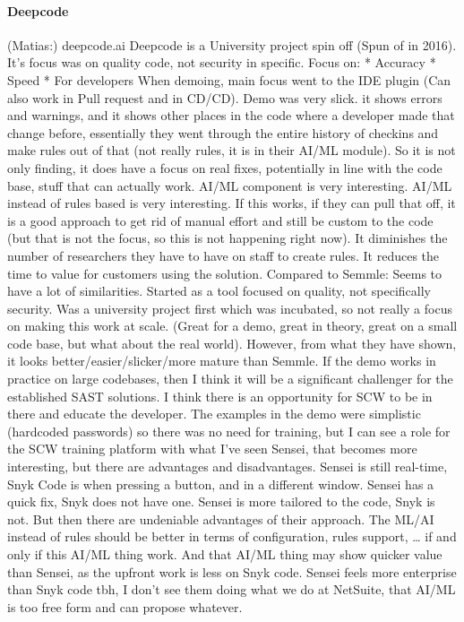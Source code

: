 \paragraph{Deepcode}
(Matias:)
deepcode.ai
Deepcode is a University project spin off (Spun of in 2016). It’s focus was on quality code, not security in specific.
Focus on:
* Accuracy
* Speed
* For developers
When demoing, main focus went to the IDE plugin (Can also work in Pull request and in CD/CD). Demo was very slick. it shows errors and warnings, and it shows other places in the code where a developer made that change before, essentially they went through the entire history of checkins and make rules out of that (not really rules, it is in their AI/ML module). So it is not only finding, it does have a focus on real fixes, potentially in line with the code base, stuff that can actually work.
AI/ML component is very interesting. AI/ML instead of rules based is very interesting. If this works, if they can pull that off, it is a good approach to get rid of manual effort and still be custom to the code (but that is not the focus, so this is not happening right now). It diminishes the number of researchers they have to have on staff to create rules. It reduces the time to value for customers using the solution.
Compared to Semmle: Seems to have a lot of similarities. Started as a tool focused on quality, not specifically security. Was a university project first which was incubated, so not really a focus on making this work at scale. (Great for a demo, great in theory, great on a small code base, but what about the real world). However, from what they have shown, it looks better/easier/slicker/more mature than Semmle.
If the demo works in practice on large codebases, then I think it will be a significant challenger for the established SAST solutions.
I think there is an opportunity for SCW to be in there and educate the developer. The examples in the demo were simplistic (hardcoded passwords) so there was no need for training, but I can see a role for the SCW training platform with what I’ve seen
Sensei, that becomes more interesting, but there are advantages and disadvantages. Sensei is still real-time, Snyk Code is when pressing a button, and in a different window. Sensei has a quick fix, Snyk does not have one. Sensei is more tailored to the code, Snyk is not. But then there are undeniable advantages of their approach. The ML/AI instead of rules should be better in terms of configuration, rules support, … if and only if this AI/ML thing work. And that AI/ML thing may show quicker value than Sensei, as the upfront work is less on Snyk code. Sensei feels more enterprise than Snyk code tbh, I don’t see them doing what we do at NetSuite, that AI/ML is too free form and can propose whatever.

